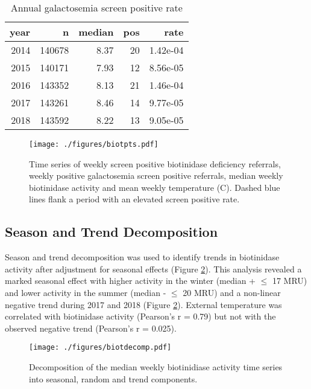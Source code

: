 \documentclass[review]{elsarticle}
\begin{document}
\begin{table}[ht]
\centering
\begin{tabular}{rrrrr}
  \hline
year & n & median & pos & rate \\ 
  \hline
2014 & 140678 & 8.37 &  20 & 1.42e-04 \\ 
  2015 & 140171 & 7.93 &  12 & 8.56e-05 \\ 
  2016 & 143352 & 8.13 &  21 & 1.46e-04 \\ 
  2017 & 143261 & 8.46 &  14 & 9.77e-05 \\ 
  2018 & 143592 & 8.22 &  13 & 9.05e-05 \\ 
   \hline
\end{tabular}
\caption{Annual galactosemia screen positive rate} 
\label{tab:galt_year}
\end{table}

\begin{figure}[htbp]
\centering
\texttt{[image: ./figures/biotpts.pdf]}
\caption{\label{fig:orgb6e3de4}Time series of weekly screen positive biotinidase deficiency referrals, weekly positive galactosemia screen positive referrals, median weekly biotinidase activity and mean weekly temperature (\degree{}C). Dashed blue lines flank a period with an elevated screen positive rate.}
\end{figure}


\clearpage

\subsection*{Season and Trend Decomposition}
\label{sec:org1acb3b7}
Season and trend decomposition was used to identify trends in
biotinidase activity after adjustment for seasonal effects (Figure
\ref{fig:orgc663c9a}). This analysis revealed a marked seasonal effect with
higher activity in the winter (median + \(\le\) 17 MRU) and lower activity
in the summer (median - \(\le\) 20 MRU) and a non-linear negative trend
during 2017 and 2018 (Figure \ref{fig:orgc663c9a}). External temperature was
correlated with biotinidase activity (Pearson's r = 0.79) but not with
the observed negative trend (Pearson's r = 0.025).

\begin{figure}[htbp]
\centering
\texttt{[image: ./figures/biotdecomp.pdf]}
\caption{\label{fig:orgc663c9a}Decomposition of the median weekly biotinidiase activity time series into seasonal, random and trend components.}
\end{figure}
\end{document}
